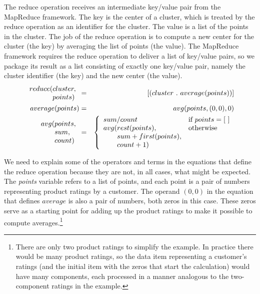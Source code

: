 The reduce operation receives
an intermediate key/value pair from the MapReduce framework.
The key is the center of a cluster, which is treated by the reduce operation
as an identifier for the cluster.
The value is a list of the points in the cluster.
The job of the reduce operation is to compute a new
center for the cluster (the key) by averaging the list of points (the value).
The MapReduce framework requires the reduce operation to deliver
a list of key/value pairs, so we package its result as a list consisting
of exactly one key/value pair, namely the cluster identifier (the key) and the
new center (the value).
\begin{eqnarray*}
    \begin{array}{l@{}l}
        reduce(&cluster, \\
               &points)
    \end{array} &=& [ ( cluster ~.~ average(points) ) ] \\
average(points) &=& avg(points, (0,0), 0) \\
\begin{array}{l@{}l}
    avg(&points, \\
        &sum, \\
        &count)
\end{array} &=&
    \left\{
        \begin{array}{l@{}ll}
            \multicolumn{2}{l}{sum / count} & \mbox{if } points = [~] \\
            avg(& rest(points),             & \mbox{otherwise} \\
                & sum+first(points),        & \\
                & count+1)                  & \\
        \end{array}
    \right.
\end{eqnarray*}

We need to explain some of the operators and terms
in the equations that define the reduce operation
because they are not, in all cases, what might be expected.
The \emph{points} variable refers to a list of points,
and each point is a pair of numbers representing product ratings
by a customer.
The operand $(0,0)$ in the equation that defines $average$ is
also a pair of numbers, both zeros in this case.
These zeros serve as a starting point for adding
up the product ratings to make it possible to compute 
averages.\footnote{There are only two product ratings
to simplify the example. In practice there would be
many product ratings, so the data item representing
a customer's ratings (and the initial item with the
zeros that start the calculation)
would have many components, each processed in a manner analogous
to the two-component ratings in the example.}

